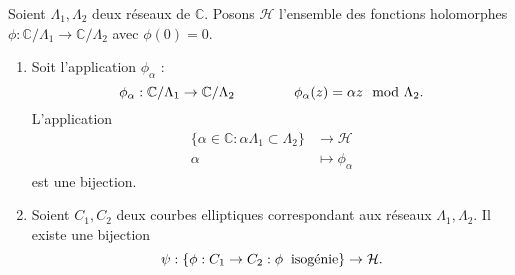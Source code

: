 \documentclass[a4paper]{article}
\begin{document}
\begin{theorem} \label{theo7}
Soient $\Lambda_{1},\Lambda_{2}$ deux réseaux de $\mathbb{C}$. Posons $\mathcal{H}$ l'ensemble des fonctions holomorphes $\phi :\mathbb{C}/\Lambda_{1} \rightarrow \mathbb{C}/\Lambda_{2}$ avec $\phi(0)=0$.
\begin{enumerate}
\item Soit l'application $\phi_{\alpha}$ : 
\begin{equation*}
\phi_{\alpha} : \mathbb{C}/\Lambda_{1} \rightarrow \mathbb{C}/\Lambda_{2} \hspace{1.5cm} \phi_{\alpha}(z)=\alpha z \mod \Lambda_{2}.
\end{equation*}
L'application
\begin{align*}
\{\alpha \in \mathbb{C} :\alpha \Lambda_{1} \subset \Lambda_{2} \} &\rightarrow \mathcal{H} \\
\alpha &\mapsto \phi_{\alpha}
\end{align*}
est une bijection.
\item Soient $C_{1},C_{2}$ deux courbes elliptiques correspondant aux réseaux $\Lambda_{1},\Lambda_{2}$.
Il existe une bijection 
\begin{equation*}
\psi : \{ \phi : C_{1} \rightarrow C_{2} : \phi \hspace{0.2cm} \text{isogénie} \} \rightarrow \mathcal{H}.
\end{equation*}
\end{enumerate}
\end{theorem}
\end{document}
